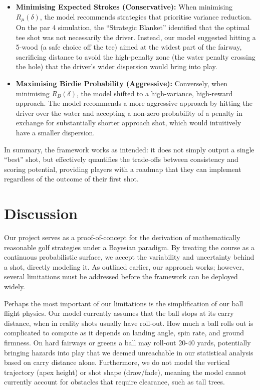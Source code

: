 \documentclass[11pt, letterpaper]{article}
\begin{document}
\begin{itemize}
    \item \textbf{Minimising Expected Strokes (Conservative):} When minimising $R_\mu(\delta)$, the model recommends strategies that prioritise variance reduction. On the par 4 simulation, the ``Strategic Blanket'' identified that the optimal tee shot was not necessarily the driver. Instead, our model suggested hitting a 5-wood (a safe choice off the tee) aimed at the widest part of the fairway, sacrificing distance to avoid the high-penalty zone (the water penalty crossing the hole) that the driver's wider dispersion would bring into play. 
    
    \item \textbf{Maximising Birdie Probability (Aggressive):} Conversely, when minimising $R_B(\delta)$, the model shifted to a high-variance, high-reward approach. The model recommends a more aggressive approach by hitting the driver over the water and accepting a non-zero probability of a penalty in exchange for substantially shorter approach shot, which would intuitively have a smaller dispersion.
\end{itemize}

In summary, the framework works as intended: it does not simply output a single ``best'' shot, but effectively quantifies the trade-offs between consistency and scoring potential, providing players with a roadmap that they can implement regardless of the outcome of their first shot.

\section{Discussion}
\label{sec:Discussion}

Our project serves as a proof-of-concept for the derivation of mathematically reasonable golf strategies under a Bayesian paradigm. By treating the course as a continuous probabilistic surface, we accept the variability and uncertainty behind a shot, directly modeling it. As outlined earlier, our approach works; however, several limitations must be addressed before the framework can be deployed widely.

Perhaps the most important of our limitations is the simplification of our ball flight physics. Our model currently assumes that the ball stops at its carry distance, when in reality shots usually have roll-out. How much a ball rolls out is complicated to compute as it depends on landing angle, spin rate, and ground firmness. On hard fairways or greens a ball may roll-out 20-40 yards, potentially bringing hazards into play that we deemed unreachable in our statistical analysis based on carry distance alone. Furthermore, we do not model the vertical trajectory (apex height) or shot shape (draw/fade), meaning the model cannot currently account for obstacles that require clearance, such as tall trees.
\end{document}
